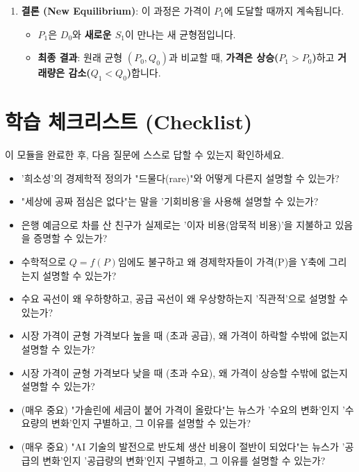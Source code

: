 \documentclass[11pt,a4paper]{article}
\theoremstyle{definition}
\begin{document}
\begin{enumerate}
    \item \textbf{결론 (New Equilibrium)}: 이 과정은 가격이 $P_1$에 도달할 때까지 계속됩니다.
        \begin{itemize}
            \item $P_1$은 $D_0$와 \textbf{새로운 $S_1$}이 만나는 새 균형점입니다.
            \item \textbf{최종 결과}: 원래 균형 $(P_0, Q_0)$과 비교할 때, \textbf{가격은 상승($P_1 > P_0$)}하고 \textbf{거래량은 감소($Q_1 < Q_0$)}합니다.
        \end{itemize}
\end{enumerate}

\newpage

\section{학습 체크리스트 (Checklist)}

이 모듈을 완료한 후, 다음 질문에 스스로 답할 수 있는지 확인하세요.

\begin{itemize}
    \item [ ] '희소성'의 경제학적 정의가 "드물다(rare)"와 어떻게 다른지 설명할 수 있는가?
    \item [ ] "세상에 공짜 점심은 없다"는 말을 '기회비용'을 사용해 설명할 수 있는가?
    \item [ ] 은행 예금으로 차를 산 친구가 실제로는 '이자 비용(암묵적 비용)'을 지불하고 있음을 증명할 수 있는가?
    \item [ ] 수학적으로 $Q=f(P)$임에도 불구하고 왜 경제학자들이 가격(P)을 Y축에 그리는지 설명할 수 있는가?
    \item [ ] 수요 곡선이 왜 우하향하고, 공급 곡선이 왜 우상향하는지 '직관적'으로 설명할 수 있는가?
    \item [ ] 시장 가격이 균형 가격보다 높을 때 (초과 공급), 왜 가격이 하락할 수밖에 없는지 설명할 수 있는가?
    \item [ ] 시장 가격이 균형 가격보다 낮을 때 (초과 수요), 왜 가격이 상승할 수밖에 없는지 설명할 수 있는가?
    \item [ ] (매우 중요) "가솔린에 세금이 붙어 가격이 올랐다"는 뉴스가 '수요의 변화'인지 '수요량의 변화'인지 구별하고, 그 이유를 설명할 수 있는가?
    \item [ ] (매우 중요) "AI 기술의 발전으로 반도체 생산 비용이 절반이 되었다"는 뉴스가 '공급의 변화'인지 '공급량의 변화'인지 구별하고, 그 이유를 설명할 수 있는가?
\end{itemize}
\end{document}
